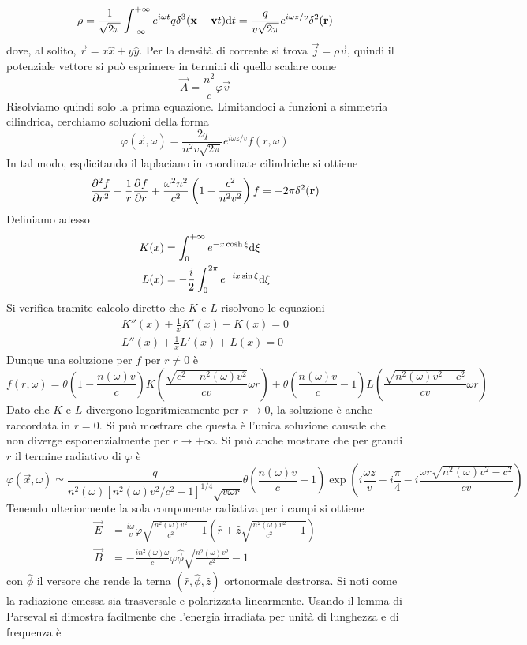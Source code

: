 \documentclass{article}
\begin{document}
\[\rho=\frac{1}{\sqrt{2\pi}}\int_{-\infty}^{+\infty}e^{i\omega t}q\delta^3(\vec{x}-\vec{v}t)\d t=\frac{q}{v\sqrt{2\pi}}e^{i\omega z/v}\delta^2(\vec{r})\]
dove, al solito, $\vec{r}=x\hat{x}+y\hat{y}$. Per la densità di corrente si trova $\vec{j}=\rho\vec{v}$, quindi il potenziale vettore si può esprimere in termini di quello scalare come
\[\vec{A}=\frac{n^2}{c}\varphi\vec{v}\]
Risolviamo quindi solo la prima equazione. Limitandoci a funzioni a simmetria cilindrica, cerchiamo soluzioni della forma
\[\varphi(\vec{x},\omega)=\frac{2q}{n^2v\sqrt{2\pi}}e^{i\omega z/v}f(r,\omega)\]
In tal modo, esplicitando il laplaciano in coordinate cilindriche si ottiene
\[\pder[2]{f}{r}+\frac{1}{r}\pder{f}{r}+\frac{\omega^2n^2}{c^2}\left(1-\frac{c^2}{n^2v^2}\right)f=-2\pi\delta^2(\vec{r})\]
Definiamo adesso
\begin{align*}
	K(x)&=\int_{0}^{+\infty}e^{-x\cosh\xi}\d\xi\\L(x)&=-\frac{i}{2}\int_{0}^{2\pi}e^{-ix\sin \xi}\d \xi
\end{align*}
Si verifica tramite calcolo diretto che $K$ e $L$ risolvono le equazioni
\begin{align*}
	K''(x)+\frac{1}{x}K'(x)-K(x)=0\\L''(x)+\frac{1}{x}L'(x)+L(x)=0
\end{align*}
Dunque una soluzione per $f$ per $r\neq0$ è 
\[f(r,\omega)=\theta\left(1-\frac{n(\omega)v}{c}\right)K\left(\frac{\sqrt{c^2-n^2(\omega)v^2}}{cv}\omega r\right)+\theta\left(\frac{n(\omega)v}{c}-1\right)L\left(\frac{\sqrt{n^2(\omega)v^2-c^2}}{cv}\omega r\right)\]
Dato che $K$ e $L$ divergono logaritmicamente per $r\to0$, la soluzione è anche raccordata in $r=0$. Si può mostrare che questa è l'unica soluzione causale che non diverge esponenzialmente per $r\to+\infty$. Si può anche mostrare che per grandi $r$ il termine radiativo di $\varphi$ è
\[\varphi(\vec{x},\omega)\simeq\frac{q}{n^2(\omega)[n^2(\omega)v^2/c^2-1]^{1/4}\sqrt{v\omega r}}\theta\left(\frac{n(\omega)v}{c}-1\right)\exp\left(i\frac{\omega z}{v}-i\frac{\pi}{4}-i\frac{\omega r\sqrt{n^2(\omega)v^2-c^2}}{cv}\right)\]
Tenendo ulteriormente la sola componente radiativa per i campi si ottiene
\begin{align*}
	\vec{E}&=\frac{i\omega}{v}\varphi\sqrt{\frac{n^2(\omega)v^2}{c^2}-1}\left(\hat{r}+\hat{z}\sqrt{\frac{n^2(\omega)v^2}{c^2}-1}\right)\\\vec{B}&=-\frac{in^2(\omega)\omega}{c}\varphi\hat{\phi}\sqrt{\frac{n^2(\omega)v^2}{c^2}-1}
\end{align*}
con $\hat{\phi}$ il versore che rende la terna $(\hat{r},\hat{\phi},\hat{z})$ ortonormale destrorsa. Si noti come la radiazione emessa sia trasversale e polarizzata linearmente. Usando il lemma di Parseval si dimostra facilmente che l'energia irradiata per unità di lunghezza e di frequenza è
\end{document}
